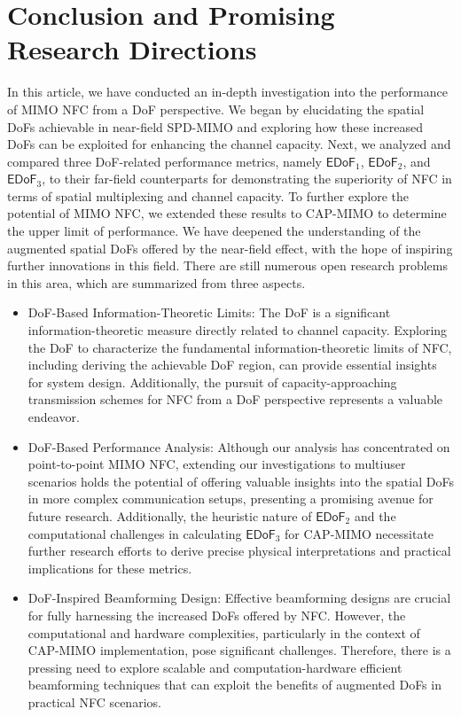 \documentclass[journal]{IEEEtran}
\theoremstyle{definition}
\begin{document}
\section{Conclusion and Promising Research Directions}
In this article, we have conducted an in-depth investigation into the performance of MIMO NFC from a DoF perspective. We began by
elucidating the spatial DoFs achievable in near-field SPD-MIMO and exploring how these increased DoFs can be exploited for enhancing the channel capacity. Next, we analyzed and compared three DoF-related performance metrics, namely ${\mathsf{EDoF}}_1$, ${\mathsf{EDoF}}_2$, and ${\mathsf{EDoF}}_3$, to their far-field counterparts for demonstrating the superiority of NFC in terms of spatial multiplexing and channel capacity. To further explore the potential of MIMO NFC, we extended these results to CAP-MIMO to determine the upper limit of performance. We have deepened the understanding of the augmented spatial DoFs offered by the near-field effect, with the hope of inspiring further innovations in this field. There are still numerous open research problems in this area, which are summarized from three aspects.
\begin{itemize}
  \item DoF-Based Information-Theoretic Limits: The DoF is a significant information-theoretic measure directly related to channel capacity. Exploring the DoF to characterize the fundamental information-theoretic limits of NFC, including deriving the achievable DoF region, can provide essential insights for system design. Additionally, the pursuit of capacity-approaching transmission schemes for NFC from a DoF perspective represents a valuable endeavor.
\item DoF-Based Performance Analysis: Although our analysis has concentrated on point-to-point MIMO NFC, extending our investigations to multiuser scenarios holds the potential of offering valuable insights into the spatial DoFs in more complex communication setups, presenting a promising avenue for future research. Additionally, the heuristic nature of ${\mathsf{EDoF}}_2$ and the computational challenges in calculating ${\mathsf{EDoF}}_3$ for CAP-MIMO necessitate further research efforts to derive precise physical interpretations and practical implications for these metrics.
\item DoF-Inspired Beamforming Design: Effective beamforming designs are crucial for fully harnessing the increased DoFs offered by NFC. However, the computational and hardware complexities, particularly in the context of CAP-MIMO implementation, pose significant challenges. Therefore, there is a pressing need to explore scalable and computation-hardware efficient beamforming techniques that can exploit the benefits of augmented DoFs in practical NFC scenarios. %
\end{itemize}
\end{document}

